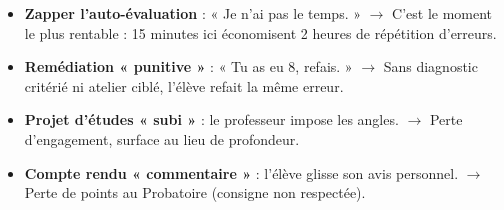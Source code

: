 \documentclass[11pt]{article}
\begin{document}
\begin{attention}
\begin{itemize}
    \item \textbf{Zapper l'auto-évaluation} : « Je n'ai pas le temps. » $\rightarrow$ C'est le moment le plus rentable : 15 minutes ici économisent 2 heures de répétition d'erreurs.
    \item \textbf{Remédiation « punitive »} : « Tu as eu 8, refais. » $\rightarrow$ Sans diagnostic critérié ni atelier ciblé, l'élève refait la même erreur.
    \item \textbf{Projet d'études « subi »} : le professeur impose les angles. $\rightarrow$ Perte d'engagement, surface au lieu de profondeur.
    \item \textbf{Compte rendu « commentaire »} : l'élève glisse son avis personnel. $\rightarrow$ Perte de points au Probatoire (consigne non respectée).
\end{itemize}
\end{attention}
\end{document}
